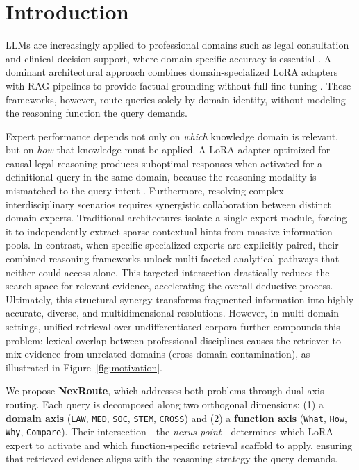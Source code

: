 \documentclass[a4paper,fleql]{cas-sc}
\begin{document}
\section{Introduction}
\label{sec:introduction}

LLMs are increasingly applied to professional domains such as legal
consultation and clinical decision support, where domain-specific accuracy
is essential \citep{brown2020gpt,touvron2023llama,singhal2023large}.
A dominant architectural approach combines domain-specialized LoRA adapters
with RAG pipelines to provide factual grounding without full fine-tuning
\citep{hu2022lora,shazeer2017outrageously,dou2024loramoe}. These frameworks,
however, route queries solely by domain identity, without modeling the
reasoning function the query demands.

Expert performance depends not only on \textit{which} knowledge domain is
relevant, but on \textit{how} that knowledge must be applied. A LoRA adapter
optimized for causal legal reasoning produces suboptimal responses when
activated for a definitional query in the same domain, because the reasoning
modality is mismatched to the query intent \citep{singhal2023large,guha2023legalbench}.
Furthermore, resolving complex interdisciplinary scenarios requires synergistic 
collaboration between distinct domain experts. Traditional architectures isolate 
a single expert module, forcing it to independently extract sparse contextual 
hints from massive information pools. In contrast, when specific specialized experts 
are explicitly paired, their combined reasoning frameworks unlock multi-faceted 
analytical pathways that neither could access alone. This targeted intersection 
drastically reduces the search space for relevant evidence, accelerating the overall 
deductive process. Ultimately, this structural synergy transforms fragmented information 
into highly accurate, diverse, and multidimensional resolutions.
However, in multi-domain settings, unified retrieval over undifferentiated corpora
further compounds this problem: lexical overlap between professional
disciplines causes the retriever to mix evidence from unrelated domains
(cross-domain contamination), as illustrated in Figure~\ref{fig:motivation}.

We propose \textbf{NexRoute}, which addresses both problems through
dual-axis routing. Each query is decomposed along two orthogonal dimensions:
(1) a \textbf{domain axis} (\texttt{LAW}, \texttt{MED}, \texttt{SOC},
\texttt{STEM}, \texttt{CROSS}) and (2) a \textbf{function axis}
(\texttt{What}, \texttt{How}, \texttt{Why}, \texttt{Compare}). Their
intersection---the \textit{nexus point}---determines which LoRA expert to
activate and which function-specific retrieval scaffold to apply, ensuring
that retrieved evidence aligns with the reasoning strategy the query demands.
\end{document}
